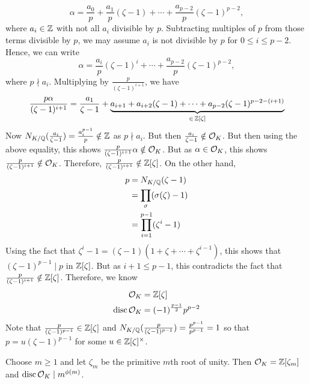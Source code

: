 \begin{ex}
	\[
	\alpha = \dfrac{a_0}{p} + \dfrac{a_1}{p} (\zeta-1) + \cdots + \dfrac{a_{p-2}}{p} (\zeta-1)^{p-2},
	\]
where $a_i \in \mathbb{Z}$ with not all $a_i$ divisible by $p$. Subtracting multiples of $p$ from those terms divisible by $p$, we may assume $a_i$ is not divisible by $p$ for $0 \leq i \leq p-2$. Hence, we can write
	\[
	\alpha = \dfrac{a_i}{p} (\zeta-1)^i + \cdots + \dfrac{a_{p-2}}{p} (\zeta-1)^{p-2},
	\]
where $p \nmid a_i$. Multiplying by $\frac{p}{(\zeta-1)^{i+1}}$, we have
	\[
	\dfrac{p\alpha}{(\zeta-1)^{i+1}} = \dfrac{a_1}{\zeta-1} + \underbrace{a_{i+1} + a_{i+2}(\zeta-1) + \cdots + a_{p-2}(\zeta-1)^{p-2-(i+1)}}_{\in\, \mathbb{Z}[\zeta]}
	\]
Now $N_{K/\mathbb{Q}}(\frac{a_i}{\zeta-1})= \frac{a_i^{p-1}}{p} \notin \mathbb{Z}$ as $p \nmid a_i$. But then $\frac{a_i}{\zeta-1} \notin \mathcal{O}_K$. But then using the above equality, this shows $\frac{p}{(\zeta-1)^{i+1}} \alpha \notin \mathcal{O}_K$. But as $\alpha \in \mathcal{O}_K$, this shows $\frac{p}{(\zeta-1)^{i+1}} \notin \mathcal{O}_K$. Therefore, $\frac{p}{(\zeta-1)^{i+1}} \notin \mathbb{Z}[\zeta]$. On the other hand,
	\[
	\begin{split}
	p&= N_{K/\mathbb{Q}}(\zeta-1) \\
	&= \prod_{\sigma} (\sigma(\zeta)-1) \\
	&=\prod_{i=1}^{p-1} (\zeta^i -1)
	\end{split}
	\]
Using the fact that $\zeta^i-1=(\zeta-1)(1+\zeta+\cdots+\zeta^{i-1})$, this shows that $(\zeta-1)^{p-1} \mid p$ in $\mathbb{Z}[\zeta]$. But as $i+1 \leq p-1$, this contradicts the fact that $\frac{p}{(\zeta-1)^{i+1}} \notin \mathbb{Z}[\zeta]$. Therefore, we know 
	\[
	\begin{split}
	\mathcal{O}_K&=\mathbb{Z}[\zeta] \\
	\operatorname{disc} \mathcal{O}_K&= (-1)^{\frac{p-1}{2}} p^{p-2}
	\end{split}
	\]
Note that $\frac{p}{(\zeta-1)^{p-1}} \in \mathbb{Z}[\zeta]$ and $N_{K/\mathbb{Q}}(\frac{p}{(\zeta-1)^{p-1}})= \frac{p^{p-1}}{p^{p-1}}=1$ so that $p=u(\zeta-1)^{p-1}$ for some $u \in \mathbb{Z}[\zeta]^\times$. \xqed \pskip
\end{ex}


\begin{rem}
Choose $m \geq 1$ and let $\zeta_m$ be the primitive $m$th root of unity. Then $\mathcal{O}_K=\mathbb{Z}[\zeta_m]$ and $\operatorname{disc} \mathcal{O}_K \mid m^{\phi(m)}$. 
\end{rem}


